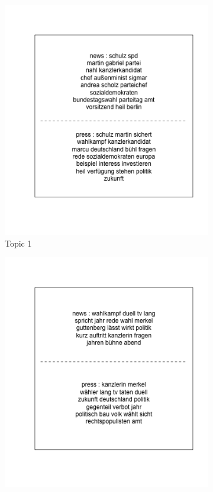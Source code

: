 \documentclass[12pt,a4paper,notitlepage]{article}
\begin{document}
\begin{figure}[H]
	\caption{Most frequent terms}
	\begin{center}
		\begin{subfigure}[normla]{0.3\textwidth}
			\includegraphics[width=\textwidth]{../figs/topiclabel/topic_label1}
			\caption{Topic 1}
		\end{subfigure}
		\begin{subfigure}[normla]{0.3\textwidth}
			\includegraphics[width=\textwidth]{../figs/topiclabel/topic_label2}

\end{subfigure}
\end{center}
\end{figure}
\end{document}

